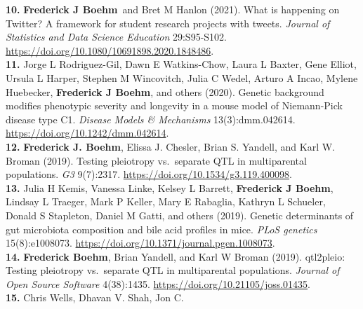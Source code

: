 \documentclass[
  10pt,
]
{article}
\begin{document}
\textbf{10.}
\normalsize \textbf{\normalsize Frederick J Boehm}\normalsize ~and
\normalsize Bret M Hanlon (2021). What is happening on Twitter? A
framework for student research projects with tweets. \emph{Journal of
Statistics and Data Science Education} 29:S95-S102.
\url{https://doi.org/10.1080/10691898.2020.1848486}.\\
\textbf{11.} \normalsize \normalsize Jorge L Rodriguez-Gil\normalsize ,
\normalsize Dawn E Watkins-Chow\normalsize , \normalsize Laura L
Baxter\normalsize , \normalsize Gene Elliot\normalsize ,
\normalsize Ursula L Harper\normalsize , \normalsize Stephen M
Wincovitch\normalsize , \normalsize Julia C Wedel\normalsize ,
\normalsize Arturo A Incao\normalsize , \normalsize Mylene
Huebecker\normalsize ,
\textbf{\normalsize Frederick J Boehm}\normalsize , and others (2020).
Genetic background modifies phenotypic severity and longevity in a mouse
model of Niemann-Pick disease type C1. \emph{Disease Models \&
Mechanisms} 13(3):dmm.042614.
\url{https://doi.org/10.1242/dmm.042614}.\\
\textbf{12.}
\normalsize \textbf{\normalsize Frederick J. Boehm}\normalsize ,
\normalsize Elissa J. Chesler\normalsize , \normalsize Brian S.
Yandell\normalsize , and \normalsize Karl W. Broman (2019). Testing
pleiotropy vs.~separate QTL in multiparental populations. \emph{G3}
9(7):2317. \url{https://doi.org/10.1534/g3.119.400098}.\\
\textbf{13.} \normalsize \normalsize Julia H Kemis\normalsize ,
\normalsize Vanessa Linke\normalsize , \normalsize Kelsey L
Barrett\normalsize , \textbf{\normalsize Frederick J Boehm}\normalsize ,
\normalsize Lindsay L Traeger\normalsize , \normalsize Mark P
Keller\normalsize , \normalsize Mary E Rabaglia\normalsize ,
\normalsize Kathryn L Schueler\normalsize , \normalsize Donald S
Stapleton\normalsize , \normalsize Daniel M Gatti\normalsize , and
others (2019). Genetic determinants of gut microbiota composition and
bile acid profiles in mice. \emph{PLoS genetics} 15(8):e1008073.
\url{https://doi.org/10.1371/journal.pgen.1008073}.\\
\textbf{14.}
\normalsize \textbf{\normalsize Frederick Boehm}\normalsize ,
\normalsize Brian Yandell\normalsize , and \normalsize Karl W Broman
(2019). qtl2pleio: Testing pleiotropy vs.~separate QTL in multiparental
populations. \emph{Journal of Open Source Software} 4(38):1435.
\url{https://doi.org/10.21105/joss.01435}.\\
\textbf{15.} \normalsize \normalsize Chris Wells\normalsize ,
\normalsize Dhavan V. Shah\normalsize , \normalsize Jon C.
\end{document}
